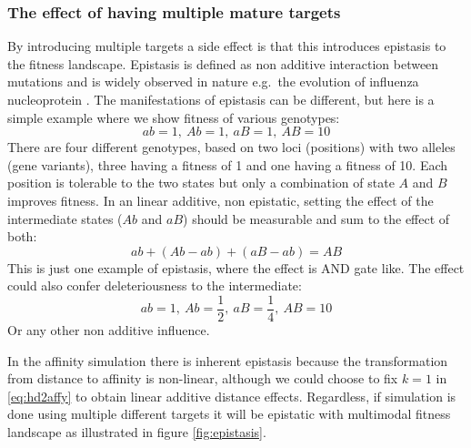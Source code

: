 \subsubsection{The effect of having multiple mature targets}
By introducing multiple targets a side effect is that this introduces epistasis to the fitness landscape.
Epistasis is defined as non additive interaction between mutations and is widely observed in nature e.g.\ the evolution of influenza nucleoprotein \cite{gong2013stability}.
The manifestations of epistasis can be different, but here is a simple example where we show fitness of various genotypes:
$$
ab = 1,\ Ab = 1,\ aB = 1,\ AB = 10
$$
There are four different genotypes, based on two loci (positions) with two alleles (gene variants), three having a fitness of 1 and one having a fitness of 10.
Each position is tolerable to the two states but only a combination of state $A$ and $B$ improves fitness.
In an linear additive, non epistatic, setting the effect of the intermediate states ($Ab$ and $aB$) should be measurable and sum to the effect of both:
$$
ab + (Ab - ab) + (aB -ab) = AB
$$
This is just one example of epistasis, where the effect is AND gate like.
The effect could also confer deleteriousness to the intermediate:
$$
ab = 1,\ Ab = \frac{1}{2},\ aB = \frac{1}{4},\ AB = 10
$$
Or any other non additive influence.

In the affinity simulation there is inherent epistasis because the transformation from distance to affinity is non-linear, although we could choose to fix $k=1$ in \eqref{eq:hd2affy} to obtain linear additive distance effects.
Regardless, if simulation is done using multiple different targets it will be epistatic with multimodal fitness landscape as illustrated in figure \ref{fig:epistasis}.


